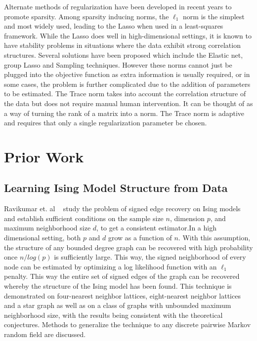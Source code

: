 \documentclass[11pt]{article}
\begin{document}
Alternate methods of regularization have been developed in recent years to promote sparsity. Among sparsity inducing norms, the $\ell_1$ norm is the simplest and most widely used, leading to the Lasso when used in a least-squares framework. While the Lasso does well in high-dimensional settings, it is known to have stability problems in situations where the data exhibit strong correlation structures. Several solutions have been proposed which include the Elastic net, group Lasso and Sampling techniques. However these norms cannot just be plugged into the objective function as extra information is usually required, or in some cases, the problem is further complicated due to the addition of parameters to be estimated. The Trace norm takes into account the correlation structure of the data but does not require manual human intervention. It can be thought of as a way of turning the rank of a matrix into a norm. The Trace norm is adaptive and requires that only a single regularization parameter be chosen. 	
\section{Prior Work}
\subsection{Learning Ising Model Structure from Data}
Ravikumar et. al ~\cite{ravikumar2010high} study the problem of signed edge recovery on Ising models and establish sufficient conditions on the sample size $n$, dimension $p$, and maximum neighborhood size $d$, to get a consistent estimator.In a high dimensional setting, both $p$ and $d$ grow as a function of $n$. With this assumption, the structure of any bounded degree graph can be recovered with high probability once $n/log(p)$ is sufficiently large. This way, the signed neighborhood of every node can be estimated by optimizing a log likelihood function with an $\ell_1$ penalty. This way the entire set of signed edges of the graph can be recovered whereby the structure of the Ising model has been found. This technique is demonstrated on four-nearest neighbor lattices, eight-nearest neighbor lattices and a star graph as well as on a class of graphs with unbounded maximum neighborhood size, with the results being consistent with the theoretical conjectures. Methods to generalize the technique to any discrete pairwise Markov random field are discussed.\\
\end{document}
